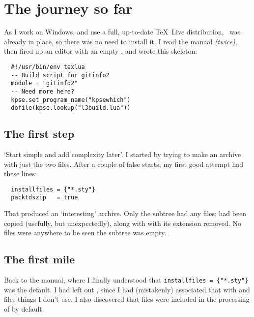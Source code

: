 \section{The journey so far}
\label{sec:journey-so-far}

As I work on Windows,
and use a full, up-to-date \TeX\ Live
distribution,
\lbuild\ was already in place,
so there was no need to install it.
I read the manual\cite{Latex3:2014:v5471} \emph{(twice)},
then fired up an editor with an empty ,
and wrote this skeleton:

\begin{verbatim}
  #!/usr/bin/env texlua
  -- Build script for gitinfo2
  module = "gitinfo2"
  -- Need more here?
  kpse.set_program_name("kpsewhich")
  dofile(kpse.lookup("l3build.lua"))
\end{verbatim}

\subsection{The first step}
\label{sec:getting-started}

`Start simple and add complexity later'.
I started by trying to make an archive with
just the two  files.
After a couple of false starts,
my first good attempt had these lines:

\begin{verbatim}
  installfiles = {"*.sty"}
  packtdszip   = true
\end{verbatim}

That produced an `interesting' archive.
Only the  subtree had any files;
 had been copied (usefully, but unexpectedly),
along with  with its extension removed.
No  files were anywhere to be seen \Dash
the  subtree was empty.

\subsection{The first mile}
\label{sec:understanding-better}

Back to the manual, where I finally understood that
\verb!installfiles = {"*.sty"}!
was the default.
I had left out ,
since I had (mistakenly) associated that with
 and  files
\Dash things I don't use.
I also discovered that  files were included
in the processing of  by default.


